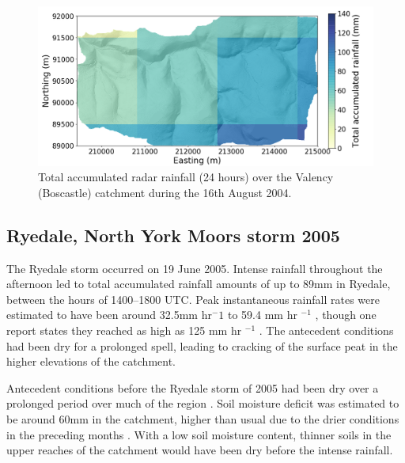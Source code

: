 
\begin{figure}[htb]
\includegraphics[width=15cm]{chp_events_figures_scripts/figure_boscastle_total_rainfall.png}
\caption{Total accumulated radar rainfall (24 hours) over the Valency (Boscastle) catchment during the 16th August 2004.}
\label{fig_boscastle_rain_totals}
\end{figure}


\subsection{Ryedale, North York Moors storm 2005}
The Ryedale storm occurred on 19 June 2005. Intense rainfall throughout the afternoon led to total accumulated rainfall amounts of up to 89mm in Ryedale, between the hours of 1400--1800 UTC. Peak instantaneous rainfall rates were estimated to have been around 32.5mm hr\(^-1\) \citep{sibley2009analysis} to 59.4 mm hr \(^{-1}\) \citep{hopkins2012knowledge}, though one report states they reached as high as 125 mm hr \(^{-1}\) \citep{cinderey2005north}. The antecedent conditions had been dry for a prolonged spell, leading to cracking of the surface peat in the higher elevations of the catchment.

Antecedent conditions before the Ryedale storm of 2005 had been dry over a prolonged period over much of the region \citep{sibley2009analysis}. Soil moisture deficit was estimated to be around 60mm in the catchment, higher than usual due to the drier conditions in the preceding months \citep{wass2008investigation}. With a low soil moisture content, thinner soils in the upper reaches of the catchment would have been dry before the intense rainfall.

